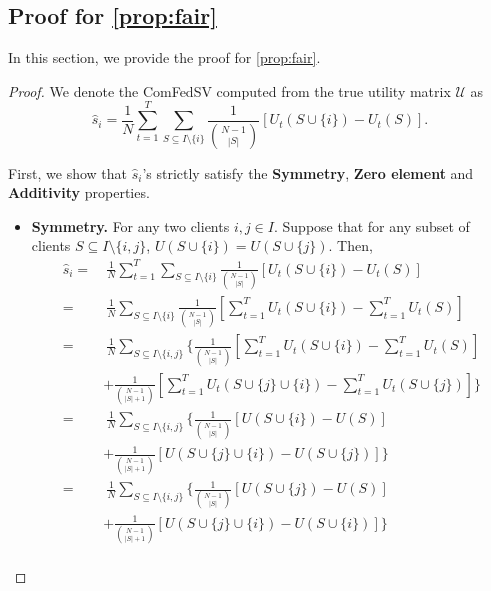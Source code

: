 \subsection{Proof for \autoref{prop:fair}}
In this section, we provide the proof for \autoref{prop:fair}. 
\begin{proof}
We denote the ComFedSV computed from the true utility matrix $\mathcal{U}$ as 
\begin{equation}
    \hat s_i = \frac{1}{N} \sum_{t=1}^T\sum\limits_{S \subseteq I \setminus\{i\}} \frac{1}{\binom{N-1}{|S|}} \left[ U_t(S \cup\{i\}) - U_t(S)\right].
\end{equation}

First, we show that $\hat s_i$'s strictly satisfy the \textbf{Symmetry}, \textbf{Zero element} and \textbf{Additivity} properties.
\begin{itemize}
    \item \textbf{Symmetry.} For any two clients $i,j \in I$. Suppose that for any subset of clients $S \subseteq I \setminus \{i,j\}$, $U(S \cup \{i\}) = U(S \cup \{j\})$. Then, 
    \begin{align*}
        \hat s_i = &~ \frac{1}{N} \sum_{t=1}^T\sum\limits_{S \subseteq I \setminus\{i\}} \frac{1}{\binom{N-1}{|S|}} \left[ U_t(S \cup\{i\}) - U_t(S)\right] \\
        = &~\frac{1}{N}\sum\limits_{S \subseteq I \setminus\{i\}} \frac{1}{\binom{N-1}{|S|}} \left[\sum_{t=1}^T U_t(S \cup\{i\}) - \sum_{t=1}^T U_t(S)\right]\\
        = &~\frac{1}{N}\sum\limits_{S \subseteq I \setminus\{i,j\}} \biggl\{\frac{1}{\binom{N-1}{|S|}} \left[\sum_{t=1}^T U_t(S \cup\{i\}) - \sum_{t=1}^T U_t(S)\right]  
        \\& + \frac{1}{\binom{N-1}{|S|+1}} \left[\sum_{t=1}^T U_t(S \cup\{j\}\cup\{i\}) - \sum_{t=1}^T U_t(S\cup\{j\})\right]\biggr\}\\
        = &~ \frac{1}{N}\sum\limits_{S \subseteq I \setminus\{i,j\}} \biggl\{\frac{1}{\binom{N-1}{|S|}} \left[U(S \cup\{i\}) - U(S)\right]  
        \\& + \frac{1}{\binom{N-1}{|S|+1}} \left[U(S \cup\{j\}\cup\{i\}) -  U(S\cup\{j\})\right]\biggr\}\\
        = &~ \frac{1}{N}\sum\limits_{S \subseteq I \setminus\{i,j\}} \biggl\{\frac{1}{\binom{N-1}{|S|}} \left[U(S \cup\{j\}) - U(S)\right]  
        \\& + \frac{1}{\binom{N-1}{|S|+1}} \left[U(S \cup\{j\}\cup\{i\}) -  U(S\cup\{i\})\right]\biggr\}\\

\end{align*}
\end{itemize}
\end{proof}
